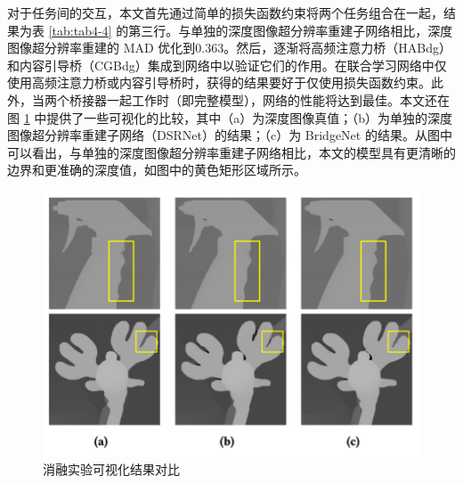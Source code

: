 对于任务间的交互，本文首先通过简单的损失函数约束将两个任务组合在一起，结果为表 \ref{tab:tab4-4} 的第三行。与单独的深度图像超分辨率重建子网络相比，深度图像超分辨率重建的 MAD 优化到0.363。然后，逐渐将高频注意力桥（HABdg）和内容引导桥（CGBdg）集成到网络中以验证它们的作用。在联合学习网络中仅使用高频注意力桥或内容引导桥时，获得的结果要好于仅使用损失函数约束。此外，当两个桥接器一起工作时（即完整模型），网络的性能将达到最佳。本文还在图 \ref{fig:fig4-5} 中提供了一些可视化的比较，其中（a）为深度图像真值；（b）为单独的深度图像超分辨率重建子网络（DSRNet）的结果；（c）为 BridgeNet 的结果。从图中可以看出，与单独的深度图像超分辨率重建子网络相比，本文的模型具有更清晰的边界和更准确的深度值，如图中的黄色矩形区域所示。

\begin{table}[!ht]


\renewcommand\arraystretch{1}
\caption{针对 BridgeNet 的消融研究量化对比}
\centering
\label{tab:tab4-4}
\end{table}

\begin{figure}[!htbp]
	\centering
	\includegraphics{figures/31.png}
	\caption{消融实验可视化结果对比}
	\label{fig:fig4-5}
	\vspace{-0.8cm}  %
	\end{figure}

